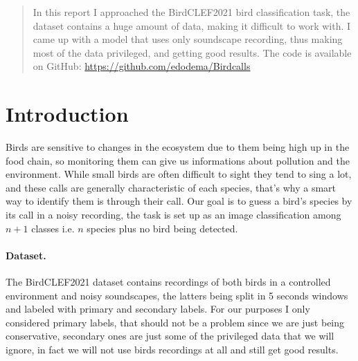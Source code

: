 \documentclass{article}
\begin{document}

\printAffiliationsAndNotice{}

\begin{abstract}
In this report I approached the BirdCLEF2021 bird classification task, the dataset contains a huge amount of data, making it difficult to work with. 
I came up with a model that uses only soundscape recording, thus making most of the data privileged, and getting good results.
The code is available on GitHub: \href{https://github.com/edodema/Birdcalls}{https://github.com/edodema/Birdcalls}
\end{abstract}

\section{Introduction}
Birds are sensitive to changes in the ecosystem due to them being high up in the food chain, so monitoring them can give us informations about pollution and the environment.
While small birds are often difficult to sight they tend to sing a lot, and these calls are generally characteristic of each species, that's why a smart way to identify them is through their call.
Our goal is to guess a bird's species by its call in a noisy recording, the task is set up as an image classification among $n+1$ classes i.e. $n$ species plus no bird being detected. 

\paragraph*{Dataset.}
The BirdCLEF2021 dataset contains recordings of both birds in a controlled environment and noisy soundscapes,  the  latters  being  split  in  5  seconds  windows  and labeled with primary and secondary labels.
For our purposes I only considered primary labels, that should not be a problem since we are just being conservative, secondary ones are just some of the privileged data that we will ignore, in fact we will not use birds recordings at all and still get good results.
\end{document}
